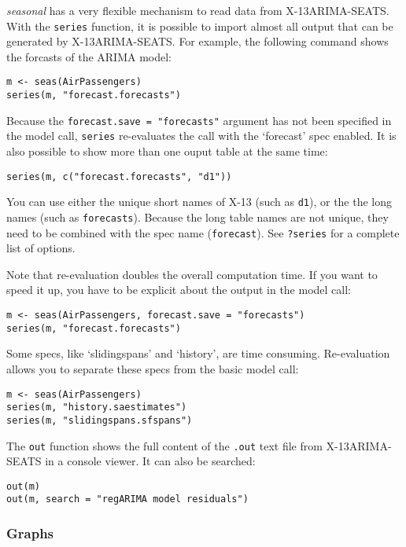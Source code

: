 \emph{seasonal} has a very flexible mechanism to read data from
X-13ARIMA-SEATS. With the \texttt{series} function, it is possible to
import almost all output that can be generated by X-13ARIMA-SEATS. For
example, the following command shows the forcasts of the ARIMA model:

\begin{verbatim}
m <- seas(AirPassengers)
series(m, "forecast.forecasts")
\end{verbatim}

Because the \texttt{forecast.save = "forecasts"} argument has not been
specified in the model call, \texttt{series} re-evaluates the call with
the `forecast' spec enabled. It is also possible to show more than one
ouput table at the same time:

\begin{verbatim}
series(m, c("forecast.forecasts", "d1"))
\end{verbatim}

You can use either the unique short names of X-13 (such as \texttt{d1}),
or the the long names (such as \texttt{forecasts}). Because the long
table names are not unique, they need to be combined with the spec name
(\texttt{forecast}). See \texttt{?series} for a complete list of
options.

Note that re-evaluation doubles the overall computation time. If you
want to speed it up, you have to be explicit about the output in the
model call:

\begin{verbatim}
m <- seas(AirPassengers, forecast.save = "forecasts")
series(m, "forecast.forecasts")
\end{verbatim}

Some specs, like `slidingspans' and `history', are time consuming.
Re-evaluation allows you to separate these specs from the basic model
call:

\begin{verbatim}
m <- seas(AirPassengers)
series(m, "history.saestimates")
series(m, "slidingspans.sfspans")
\end{verbatim}

The \texttt{out} function shows the full content of the \texttt{.out}
text file from X-13ARIMA-SEATS in a console viewer. It can also be
searched:

\begin{verbatim}
out(m)
out(m, search = "regARIMA model residuals")
\end{verbatim}

\subsubsection{Graphs}\label{graphs}


